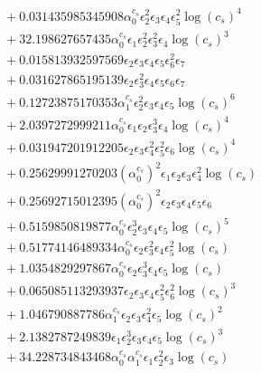 \documentclass[10pt]{article}
\begin{document}
\begin{align*}
&{}  + 0.031435985345908 \alpha_{0}^{c_s} \epsilon_{2}^{2} \epsilon_{3} \epsilon_{4} \epsilon_{5}^{2} \log{\left(c_{s} \right)}^{4} \\
&{}  + 32.198627657435 \alpha_{0}^{c_s} \epsilon_{1} \epsilon_{2}^{2} \epsilon_{3}^{2} \epsilon_{4} \log{\left(c_{s} \right)}^{3} \\
&{}  + 0.015813932597569 \epsilon_{2} \epsilon_{3} \epsilon_{4} \epsilon_{5} \epsilon_{6}^{2} \epsilon_{7} \\
&{}  + 0.031627865195139 \epsilon_{2} \epsilon_{3}^{2} \epsilon_{4} \epsilon_{5} \epsilon_{6} \epsilon_{7} \\
&{}  + 0.12723875170353 \alpha_{1}^{c_s} \epsilon_{2}^{2} \epsilon_{3} \epsilon_{4} \epsilon_{5} \log{\left(c_{s} \right)}^{6} \\
&{}  + 2.0397272999211 \alpha_{0}^{c_s} \epsilon_{1} \epsilon_{2} \epsilon_{3}^{3} \epsilon_{4} \log{\left(c_{s} \right)}^{4} \\
&{}  + 0.031947201912205 \epsilon_{2} \epsilon_{3} \epsilon_{4}^{2} \epsilon_{5}^{2} \epsilon_{6} \log{\left(c_{s} \right)}^{4} \\
&{}  + 0.25629991270203 \left(\alpha_{0}^{c_s}\right)^{2} \epsilon_{1} \epsilon_{2} \epsilon_{3} \epsilon_{4}^{2} \log{\left(c_{s} \right)} \\
&{}  + 0.25692715012395 \left(\alpha_{0}^{c_s}\right)^{2} \epsilon_{2} \epsilon_{3} \epsilon_{4} \epsilon_{5} \epsilon_{6} \\
&{}  + 0.5159850819877 \alpha_{0}^{c_s} \epsilon_{2}^{3} \epsilon_{3} \epsilon_{4} \epsilon_{5} \log{\left(c_{s} \right)}^{5} \\
&{}  + 0.51774146489334 \alpha_{0}^{c_s} \epsilon_{2} \epsilon_{3}^{2} \epsilon_{4} \epsilon_{5}^{2} \log{\left(c_{s} \right)} \\
&{}  + 1.0354829297867 \alpha_{0}^{c_s} \epsilon_{2} \epsilon_{3}^{3} \epsilon_{4} \epsilon_{5} \log{\left(c_{s} \right)} \\
&{}  + 0.065085113293937 \epsilon_{2} \epsilon_{3} \epsilon_{4} \epsilon_{5}^{2} \epsilon_{6}^{2} \log{\left(c_{s} \right)}^{3} \\
&{}  + 1.046790887786 \alpha_{1}^{c_s} \epsilon_{2} \epsilon_{3} \epsilon_{4}^{2} \epsilon_{5} \log{\left(c_{s} \right)}^{2} \\
&{}  + 2.1382787249839 \epsilon_{1} \epsilon_{2}^{3} \epsilon_{3} \epsilon_{4} \epsilon_{5} \log{\left(c_{s} \right)}^{3} \\
&{}  + 34.228734843468 \alpha_{0}^{c_s} \alpha_{1}^{c_s} \epsilon_{1} \epsilon_{2}^{2} \epsilon_{3} \log{\left(c_{s} \right)} \\

\end{align*}
\end{document}
